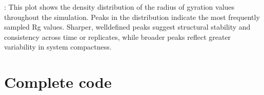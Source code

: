 \documentclass[a4paper,10pt,english]{sphinxmanual}
\let\sphinxpxdimen\pdfpxdimen\else\newdimen\sphinxpxdimen
\begin{document}
\begin{sphinxVerbatim}[commandchars=\\\{\}]
  
\end{sphinxVerbatim}

\noindent{\hspace*{\fill}\sphinxincludegraphics[width=500\sphinxpxdimen]{{Rg_density}.png}\hspace*{\fill}}

\sphinxAtStartPar
{}: This plot shows the density distribution of the radius of gyration values throughout the simulation. Peaks in the distribution indicate the most frequently sampled Rg values. Sharper, well\sphinxhyphen{}defined peaks suggest structural stability and consistency across time or replicates, while broader peaks reflect greater variability in system compactness.


\section{Complete code}
\label{\detokenize{Rg:complete-code}}
\begin{sphinxVerbatim}[commandchars=\\\{\}]
 
\end{sphinxVerbatim}

\begin{sphinxVerbatim}[commandchars=\\\{\}]
\end{sphinxVerbatim}
\end{document}
